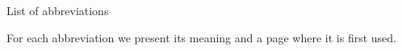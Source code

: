 
\vfill\eject
\appendix List of abbreviations

For each abbreviation we present its meaning and a page where it is first used.

\makeglos

